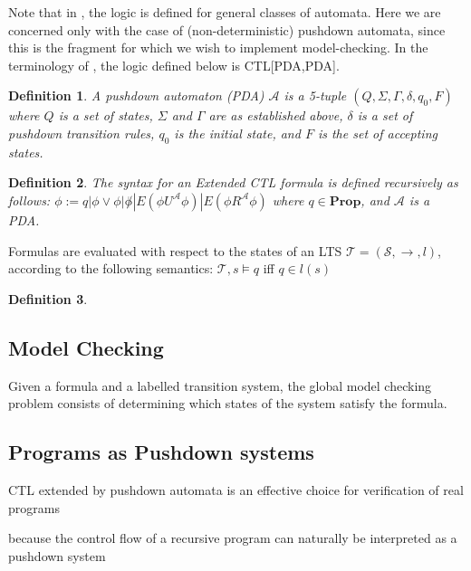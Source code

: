 \documentclass[11pt]{article}
\newtheorem{mydef}{Definition}
\begin{document}
Note that in \cite{Kreutzer10}, the logic is defined for general classes of
automata. Here we are concerned only with the case of (non-deterministic)
pushdown automata, since this is the fragment for which we wish to implement
model-checking. In the terminology of \cite{Kreutzer10}, the logic defined
below is CTL[PDA,PDA].

\begin{mydef}
A pushdown automaton (PDA) $\mathcal{A}$ is a 5-tuple $(Q, \Sigma, \Gamma, \delta, q_0, F)$ where
$Q$ is a set of states, $\Sigma$ and $\Gamma$ are as established above,
$\delta$ is a set of pushdown transition rules, $q_0$ is the initial state, and
$F$ is the set of accepting states.
\end{mydef}

\begin{mydef}
The syntax for an Extended CTL formula is defined recursively as follows:
   $\phi := q | \phi \vee \phi | \not \phi | E(\phi U^\mathcal{A} \phi) | E(\phi
   R^\mathcal{A} \phi) $ 
where $q \in \textbf{Prop}$, and $\mathcal{A}$ is a PDA.
\end{mydef}

Formulas are evaluated with respect to the states of an LTS $\mathcal{T} = (\mathcal{S},
\rightarrow, l)$, according to the following semantics:
$\mathcal{T}, s \models q$ iff $q \in l(s)$

\begin{mydef} \end{mydef}



\subsection{Model Checking}

Given a formula and a labelled transition system, the global model checking
problem consists of determining which states of the system satisfy the formula.


\subsection{Programs as Pushdown systems}

CTL extended by pushdown automata is an effective choice for verification of real programs

because the control flow of a recursive program can naturally be 
interpreted
as a pushdown system
\end{document}
